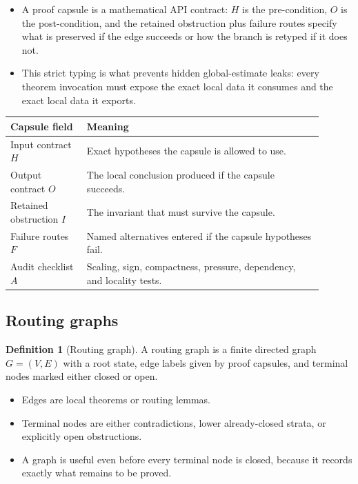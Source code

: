 \documentclass[11pt]{article}
\theoremstyle{plain}
\theoremstyle{definition}
\newtheorem{definition}[theorem]{Definition}
\theoremstyle{remark}
\begin{document}
\begin{itemize}
  \item A proof capsule is a mathematical API contract: $H$ is the pre-condition, $O$ is the post-condition, and the retained obstruction plus failure routes specify what is preserved if the edge succeeds or how the branch is retyped if it does not.
  \item This strict typing is what prevents hidden global-estimate leaks: every theorem invocation must expose the exact local data it consumes and the exact local data it exports.
\end{itemize}

\begin{center}
\begin{tabular}{p{0.22\linewidth}p{0.68\linewidth}}
\toprule
Capsule field & Meaning \\
\midrule
Input contract $H$ & Exact hypotheses the capsule is allowed to use. \\
Output contract $O$ & The local conclusion produced if the capsule succeeds. \\
Retained obstruction $I$ & The invariant that must survive the capsule. \\
Failure routes $F$ & Named alternatives entered if the capsule hypotheses fail. \\
Audit checklist $A$ & Scaling, sign, compactness, pressure, dependency, and locality tests. \\
\bottomrule
\end{tabular}
\end{center}

\subsection{Routing graphs}
\begin{definition}[Routing graph]
A routing graph is a finite directed graph $G=(V,E)$ with a root state, edge labels given by proof capsules, and terminal nodes marked either closed or open.
\end{definition}

\begin{itemize}
  \item Edges are local theorems or routing lemmas.
  \item Terminal nodes are either contradictions, lower already-closed strata, or explicitly open obstructions.
  \item A graph is useful even before every terminal node is closed, because it records exactly what remains to be proved.
\end{itemize}
\end{document}
